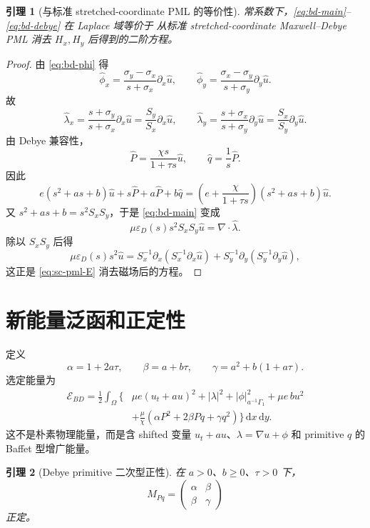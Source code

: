 \documentclass[UTF8,a4paper,11pt]{ctexart}
\newtheorem{lemma}{引理}
\newcommand{\dd}{\,\mathrm d}
\newcommand{\sx}{\sigma_x}
\newcommand{\sy}{\sigma_y}
\newcommand{\Ecal}{\mathcal E}
\begin{document}
\begin{lemma}[与标准 stretched-coordinate PML 的等价性]
常系数下，\eqref{eq:bd-main}--\eqref{eq:bd-debye} 在 Laplace 域等价于
从标准 stretched-coordinate Maxwell--Debye PML 消去 \(H_x,H_y\) 后得到的二阶方程。
\end{lemma}

\begin{proof}
由 \eqref{eq:bd-phi} 得
\[
\widehat\phi_x=\frac{\sy-\sx}{s+\sx}\partial_x\widehat u,\qquad
\widehat\phi_y=\frac{\sx-\sy}{s+\sy}\partial_y\widehat u.
\]
故
\[
\widehat\lambda_x
=\frac{s+\sy}{s+\sx}\partial_x\widehat u
=\frac{S_y}{S_x}\partial_x\widehat u,\qquad
\widehat\lambda_y
=\frac{s+\sx}{s+\sy}\partial_y\widehat u
=\frac{S_x}{S_y}\partial_y\widehat u.
\]
由 Debye 兼容性，
\[
\widehat P=\frac{\chi s}{1+\tau s}\widehat u,\qquad
\widehat q=\frac1s\widehat P.
\]
因此
\[
e(s^2+as+b)\widehat u+s\widehat P+a\widehat P+b\widehat q
=\left(e+\frac{\chi}{1+\tau s}\right)(s^2+as+b)\widehat u.
\]
又 \(s^2+as+b=s^2S_xS_y\)，于是 \eqref{eq:bd-main} 变成
\[
\mu\varepsilon_D(s)s^2S_xS_y\widehat u=\nabla\cdot\widehat\lambda.
\]
除以 \(S_xS_y\) 后得
\[
\mu\varepsilon_D(s)s^2\widehat u
=S_x^{-1}\partial_x(S_x^{-1}\partial_x\widehat u)
+S_y^{-1}\partial_y(S_y^{-1}\partial_y\widehat u),
\]
这正是 \eqref{eq:sc-pml-E} 消去磁场后的方程。
\end{proof}

\section{新能量泛函和正定性}

定义
\[
\alpha=1+2a\tau,\qquad
\beta=a+b\tau,\qquad
\gamma=a^2+b(1+a\tau).
\]
选定能量为
\begin{equation}
\boxed{
\begin{aligned}
\Ecal_{BD}
=\frac12\int_\Omega \{&
\mu e(u_t+a u)^2+|\lambda|^2
+|\phi|_{a^{-1}\Gamma_1}^2+\mu e\,b u^2\\
&+\frac{\mu}{\chi}\left(\alpha P^2+2\beta Pq+\gamma q^2\right)
\}\dd x\dd y .
\end{aligned}}
\label{eq:EBD}
\end{equation}
这不是朴素物理能量，而是含 shifted 变量 \(u_t+a u\)、\(\lambda=\nabla u+\phi\)
和 primitive \(q\) 的 Baffet 型增广能量。

\begin{lemma}[Debye primitive 二次型正性]
在 \(a>0\)、\(b\ge0\)、\(\tau>0\) 下，
\[
M_{Pq}=\begin{pmatrix}\alpha&\beta\\ \beta&\gamma\end{pmatrix}
\]
正定。
\end{lemma}
\end{document}
